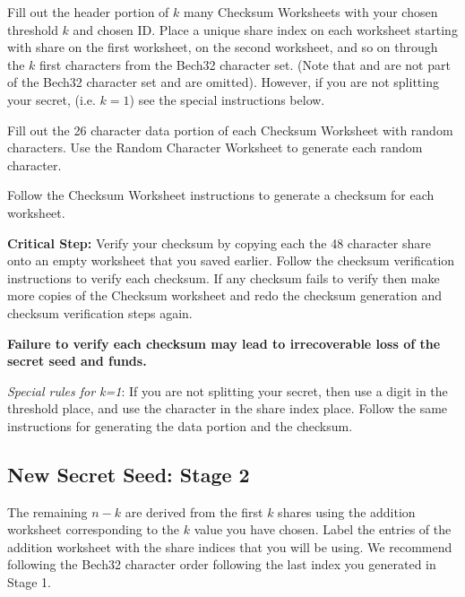 \documentclass{article}
\newcommand{\tmem}[1]{{\em #1\/}}
\newcommand{\tmstrong}[1]{\textbf{#1}}
\newcommand{\tmverbatim}[1]{{\ttfamily{#1}}}
\begin{document}
Fill out the header portion of $k$ many Checksum Worksheets with your chosen
threshold $k$ and chosen ID. Place a unique share index on each worksheet
starting with share \tmverbatim{A} on the first worksheet, \tmverbatim{C} on
the second worksheet, and so on through the $k$ first characters from the
Bech32 character set. (Note that \tmverbatim{B} and \tmverbatim{I} are not
part of the Bech32 character set and are omitted). However, if you are not
splitting your secret, (i.e. $k = 1$) see the special instructions below.

Fill out the 26 character data portion of each Checksum Worksheet with random
characters. Use the Random Character Worksheet to generate each random
character.

Follow the Checksum Worksheet instructions to generate a checksum for each
worksheet.

{\tmstrong{Critical Step:}} Verify your checksum by copying each the 48
character share onto an empty worksheet that you saved earlier. Follow the
checksum verification instructions to verify each checksum. If any checksum
fails to verify then make more copies of the Checksum worksheet and redo the
checksum generation and checksum verification steps again.

{\tmstrong{Failure to verify each checksum may lead to irrecoverable loss of
the secret seed and funds.}}

{\tmem{Special rules for k=1}}: If you are not splitting your secret, then use
a \tmverbatim{0} digit in the threshold place, and use the \tmverbatim{S}
character in the share index place. Follow the same instructions for
generating the data portion and the checksum.

\subsection{New Secret Seed: Stage 2}\label{NewSecret2}

The remaining $n - k$ are derived from the first $k$ shares using the addition
worksheet corresponding to the $k$ value you have chosen. Label the entries of
the addition worksheet with the share indices that you will be using. We
recommend following the Bech32 character order following the last index you
generated in Stage 1.
\end{document}
